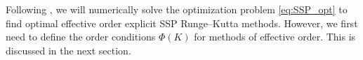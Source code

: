 Following \cite{Ketcheson2008, Ketcheson/Macdonald/Gottlieb:2009}, 
we will numerically solve the optimization problem \eqref{eq:SSP_opt} to find
optimal effective order explicit SSP Runge--Kutta methods.
However, we first need to define the order conditions $\Phi(K)$ for methods
of effective order.
This is discussed in the next section.
